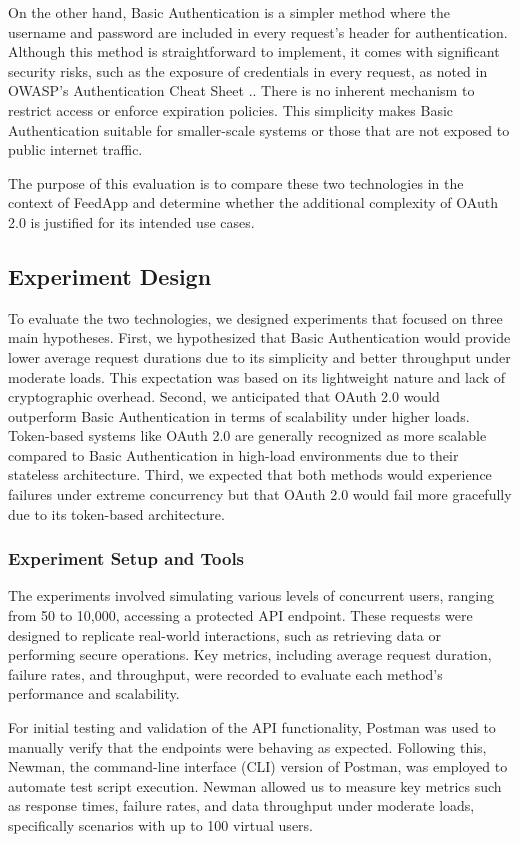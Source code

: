 On the other hand, Basic Authentication is a simpler method where the username and password are included in every request’s header for authentication. Although this method is straightforward to implement, it comes with significant security risks, such as the exposure of credentials in every request, as noted in OWASP’s Authentication Cheat Sheet \cite{owasp:authcheatsheet}.. There is no inherent mechanism to restrict access or enforce expiration policies. This simplicity makes Basic Authentication suitable for smaller-scale systems or those that are not exposed to public internet traffic.

The purpose of this evaluation is to compare these two technologies in the context of FeedApp and determine whether the additional complexity of OAuth 2.0 is justified for its intended use cases.

\subsection{Experiment Design}
To evaluate the two technologies, we designed experiments that focused on three main hypotheses. First, we hypothesized that Basic Authentication would provide lower average request durations due to its simplicity and better throughput under moderate loads. This expectation was based on its lightweight nature and lack of cryptographic overhead. Second, we anticipated that OAuth 2.0 would outperform Basic Authentication in terms of scalability under higher loads. Token-based systems like OAuth 2.0 are generally recognized as more scalable compared to Basic Authentication in high-load environments due to their stateless architecture. Third, we expected that both methods would experience failures under extreme concurrency but that OAuth 2.0 would fail more gracefully due to its token-based architecture.
\subsubsection*{Experiment Setup and Tools}
The experiments involved simulating various levels of concurrent users, ranging from 50 to 10,000, accessing a protected API endpoint. These requests were designed to replicate real-world interactions, such as retrieving data or performing secure operations. Key metrics, including average request duration, failure rates, and throughput, were recorded to evaluate each method’s performance and scalability.

For initial testing and validation of the API functionality, Postman was used to manually verify that the endpoints were behaving as expected. Following this, Newman, the command-line interface (CLI) version of Postman, was employed to automate test script execution. Newman allowed us to measure key metrics such as response times, failure rates, and data throughput under moderate loads, specifically scenarios with up to 100 virtual users.

